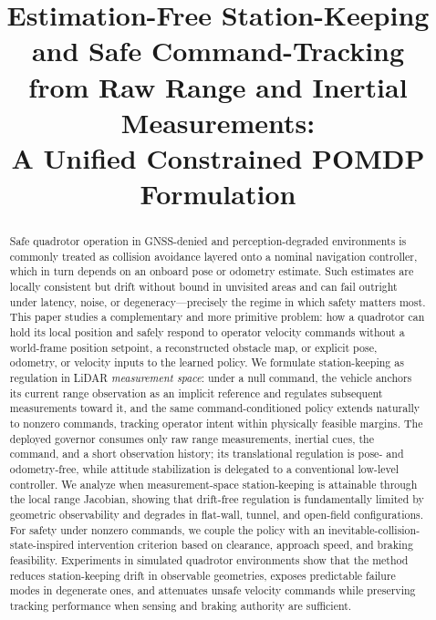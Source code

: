 \documentclass[11pt]{article}
\title{Estimation-Free Station-Keeping and Safe Command-Tracking\\
from Raw Range and Inertial Measurements:\\
A Unified Constrained POMDP Formulation}
\author{}
\date{}
\begin{document}
\maketitle

\begin{abstract}
Safe quadrotor operation in GNSS-denied and perception-degraded environments
is commonly treated as collision avoidance layered onto a nominal navigation
controller, which in turn depends on an onboard pose or odometry estimate.
Such estimates are locally consistent but drift without bound in unvisited
areas and can fail outright under latency, noise, or degeneracy---precisely
the regime in which safety matters most. This paper studies a complementary
and more primitive problem: how a quadrotor can hold its local position and
safely respond to operator velocity commands without a world-frame position
setpoint, a reconstructed obstacle map, or explicit pose, odometry, or
velocity inputs to the learned policy. We formulate station-keeping as
regulation in LiDAR \emph{measurement space}: under a null command, the
vehicle anchors its current range observation as an implicit reference and
regulates subsequent measurements toward it, and the same command-conditioned
policy extends naturally to nonzero commands, tracking operator intent within
physically feasible margins. The deployed governor consumes only raw range
measurements, inertial cues, the command, and a short observation history;
its translational regulation is pose- and odometry-free, while attitude
stabilization is delegated to a conventional low-level controller. We analyze
when measurement-space station-keeping is attainable through the local range
Jacobian, showing that drift-free regulation is fundamentally limited by
geometric observability and degrades in flat-wall, tunnel, and open-field
configurations. For safety under nonzero commands, we couple the policy with
an inevitable-collision-state-inspired intervention criterion based on
clearance, approach speed, and braking feasibility. Experiments in simulated
quadrotor environments show that the method reduces station-keeping drift in
observable geometries, exposes predictable failure modes in degenerate ones,
and attenuates unsafe velocity commands while preserving tracking performance
when sensing and braking authority are sufficient.
\end{abstract}

\end{document}

